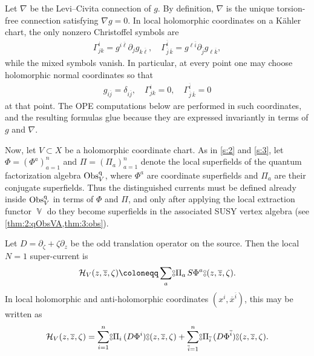 \documentclass[final,reqno]{amsart}
\numberwithin{equation}{section}
\theoremstyle{definition}
\newcommand{\ol}{\overline}
\newcommand{\ceq}{\coloneqq} %
\newcommand{\clH}{\mathcal{H}}
\newcommand{\pd}{\partial}
\newcommand{\qObs}[1]{\mathop{\Obs^{\textup{q}}_{#1}}}
\newcommand{\dbc}{%
 \mathrel{\vcenter{\hbox{\ooalign{%
  \raisebox{0.5ex}{$\scriptstyle \circ$}\cr%
  \raisebox{-0.5ex}{$\scriptstyle \circ$}%
 }}}}%
}
\newcommand{\nod}[1]{\mathopen{\dbc} \mathrel{#1} \mathclose{\dbc}}
\DeclareMathOperator{\bbV}{\mathbb{V}}
\DeclareMathOperator{\Obs}{Obs}
\begin{document}
Let $\nabla$ be the Levi--Civita connection of $g$. 
By definition, $\nabla$ is the unique torsion-free connection satisfying $\nabla g=0$. 
In local holomorphic coordinates on a K\"ahler chart, 
the only nonzero Christoffel symbols are
\begin{align*}
 \Gamma^{i}_{jk} = g^{i\ol{\ell}} \pd_j g_{k\ol{\ell}}, \quad
 \Gamma^{\ol{i}}_{\ol{j}\,\ol{k}} = g^{\ell\ol{i}} \pd_{\ol{j}} g_{\ell\ol{k}},
\end{align*}
while the mixed symbols vanish. 
In particular, at every point 
one may choose holomorphic normal coordinates so that
\begin{align*}
 g_{i\ol{j}}=\delta_{i\ol{j}}, \quad
 \Gamma^i_{jk}=0, \quad
 \Gamma^{\ol{i}}_{\ol{j}\,\ol{k}}=0
\end{align*}
at that point. The OPE computations below are performed in such coordinates, and
the resulting formulas glue because they are expressed invariantly in terms of
$g$ and $\nabla$. 

Now, let $V \subset X$ be a holomorphic coordinate chart. 
As in \cref{s:2} and \cref{s:3}, 
let $\Phi=(\Phi^a)_{a=1}^n$ and $\Pi=(\Pi_a)_{a=1}^n$ denote 
the local superfields of the quantum factorization algebra $\qObs{V}$, 
where $\Phi^a$ are coordinate superfields and 
$\Pi_a$ are their conjugate superfields. 
Thus the distinguished currents must be defined already 
inside $\qObs{V}$ in terms of $\Phi$ and $\Pi$, 
and only after applying the local extraction functor $\bbV$ 
do they become superfields in the associated SUSY vertex algebra
(see \cref{thm:2:qObsVA,thm:3:obs}). 

Let $D=\pd_\zeta+\zeta\pd_z$ be the odd translation operator on the source. 
Then the local $N=1$ super-current is
\begin{align}\label{eq:4.2}
 \clH_V(z,\ol{z},\zeta) \ceq \sum_a \nod{\Pi_a\,S\Phi^a}(z,\ol{z},\zeta).
\end{align}
In local holomorphic and anti-holomorphic coordinates
$(x^i,\ol{x}^{\ol{i}})$, this may be written as
\[
 \clH_V(z,\ol{z},\zeta) = \sum_{i=1}^n \nod{\Pi_i\,(D\Phi^i)}(z,\ol{z},\zeta)
     + \sum_{\ol{i}=1}^n \nod{\Pi_{\ol{i}}\,(D\Phi^{\ol{i}})}(z,\ol{z},\zeta).
\]
\end{document}
